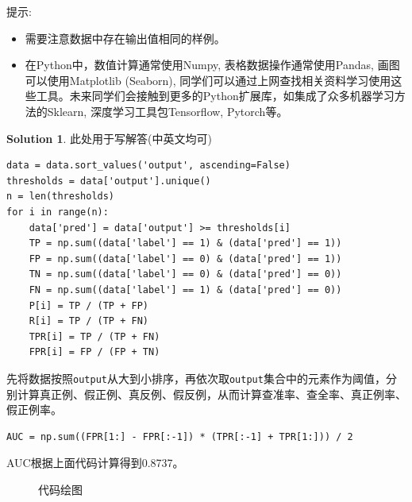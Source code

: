 \documentclass[a4paper,UTF8]{article}
\theoremstyle{definition}
\newtheorem*{solution}{Solution}
\begin{document}
提示:
\begin{itemize}
	\item 需要注意数据中存在输出值相同的样例。
	\item 
	在Python中，数值计算通常使用Numpy, 表格数据操作通常使用Pandas, 画图可以使用Matplotlib (Seaborn), 同学们可以通过上网查找相关资料学习使用这些工具。未来同学们会接触到更多的Python扩展库，如集成了众多机器学习方法的Sklearn, 深度学习工具包Tensorflow, Pytorch等。
\end{itemize}
\begin{solution}
此处用于写解答(中英文均可)	
\begin{verbatim}
data = data.sort_values('output', ascending=False)
thresholds = data['output'].unique()
n = len(thresholds)
for i in range(n):
    data['pred'] = data['output'] >= thresholds[i]
    TP = np.sum((data['label'] == 1) & (data['pred'] == 1))
    FP = np.sum((data['label'] == 0) & (data['pred'] == 1))
    TN = np.sum((data['label'] == 0) & (data['pred'] == 0))
    FN = np.sum((data['label'] == 1) & (data['pred'] == 0))
    P[i] = TP / (TP + FP)
    R[i] = TP / (TP + FN)
    TPR[i] = TP / (TP + FN)
    FPR[i] = FP / (FP + TN)
\end{verbatim}
先将数据按照\verb|output|从大到小排序，再依次取\verb|output|集合中的元素作为阈值，分别计算真正例、假正例、真反例、假反例，从而计算查准率、查全率、真正例率、假正例率。
\begin{verbatim}
AUC = np.sum((FPR[1:] - FPR[:-1]) * (TPR[:-1] + TPR[1:])) / 2
\end{verbatim}
AUC根据上面代码计算得到0.8737。
\begin{figure}[h]
	\centering
	\caption{代码绘图}
\end{figure}
\end{solution}
\end{document}
